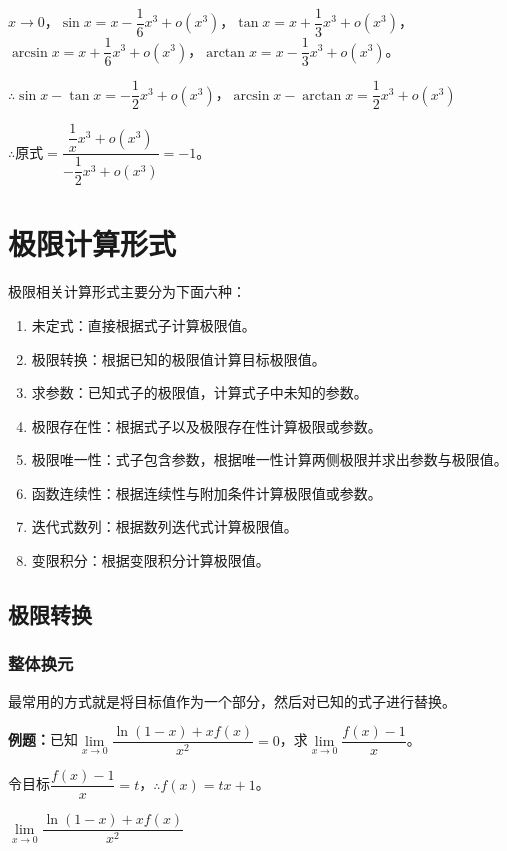 $x\to 0$，$\sin x=x-\dfrac{1}{6}x^3+o(x^3)$，$\tan x=x+\dfrac{1}{3}x^3+o(x^3)$，$\arcsin x=x+\dfrac{1}{6}x^3+o(x^3)$，$\arctan x=x-\dfrac{1}{3}x^3+o(x^3)$。

$\therefore \sin x-\tan x=-\dfrac{1}{2}x^3+o(x^3)$，$\arcsin x-\arctan x=\dfrac{1}{2}x^3+o(x^3)$

$\therefore \text{原式}=\dfrac{\dfrac{1}{x}x^3+o(x^3)}{-\dfrac{1}{2}x^3+o(x^3)}=-1$。


\section{极限计算形式}

极限相关计算形式主要分为下面六种：

\begin{enumerate}
    \item 未定式：直接根据式子计算极限值。
    \item 极限转换：根据已知的极限值计算目标极限值。
    \item 求参数：已知式子的极限值，计算式子中未知的参数。
    \item 极限存在性：根据式子以及极限存在性计算极限或参数。
    \item 极限唯一性：式子包含参数，根据唯一性计算两侧极限并求出参数与极限值。
    \item 函数连续性：根据连续性与附加条件计算极限值或参数。
    \item 迭代式数列：根据数列迭代式计算极限值。
    \item 变限积分：根据变限积分计算极限值。
\end{enumerate}

\subsection{极限转换}

\subsubsection{整体换元}

最常用的方式就是将目标值作为一个部分，然后对已知的式子进行替换。

\textbf{例题：}已知$\lim\limits_{x\to 0}\dfrac{\ln(1-x)+xf(x)}{x^2}=0$，求$\lim\limits_{x\to 0}\dfrac{f(x)-1}{x}$。\medskip

令目标$\dfrac{f(x)-1}{x}=t$，$\therefore f(x)=tx+1$。\medskip

$\lim\limits_{x\to 0}\dfrac{\ln(1-x)+xf(x)}{x^2}$\medskip

